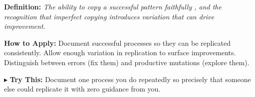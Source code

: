 \begin{tcolorbox}[title={\small \textbf{37 | Replication}},
  colback=blue!5!white, colframe=blue!40!black,
  fonttitle=\bfseries\small, boxrule=0.5pt]
\textbf{Definition:} \textit{The ability to copy a successful pattern faithfully , and the recognition that imperfect copying introduces variation that can drive improvement.}

\medskip
\textbf{How to Apply:} Document successful processes so they can be replicated consistently. Allow enough variation in replication to surface improvements. Distinguish between errors (fix them) and productive mutations (explore them).

\medskip
$\blacktriangleright$ \textbf{Try This:} Document one process you do repeatedly so precisely that someone else could replicate it with zero guidance from you.
\end{tcolorbox}
